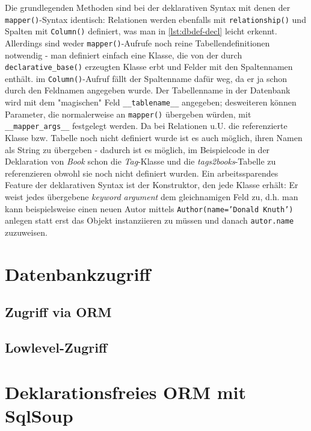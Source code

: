 Die grundlegenden Methoden sind bei der deklarativen Syntax mit denen der
\texttt{mapper()}-Syntax identisch: Relationen werden ebenfalls mit
\texttt{relationship()} und Spalten mit \texttt{Column()} definiert, was man in
\autoref{lst:dbdef-decl} leicht erkennt.
Allerdings sind weder \texttt{mapper()}-Aufrufe noch reine Tabellendefinitionen
notwendig - man definiert einfach eine Klasse, die von der durch
\texttt{declarative\_base()} erzeugten Klasse erbt und Felder mit den
Spaltennamen enthält. im \texttt{Column()}-Aufruf fällt der Spaltenname dafür
weg, da er ja schon durch den Feldnamen angegeben wurde. Der Tabellenname in der
Datenbank wird mit dem "magischen" Feld \texttt{\_\_tablename\_\_} angegeben;
desweiteren können Parameter, die normalerweise an \texttt{mapper()} übergeben
würden, mit \texttt{\_\_mapper\_args\_\_} festgelegt werden.
Da bei Relationen u.U. die referenzierte Klasse bzw. Tabelle noch nicht definiert
wurde ist es auch möglich, ihren Namen als String zu übergeben - dadurch ist es
möglich, im Beispielcode in der Deklaration von \emph{Book} schon die
\emph{Tag}-Klasse und die \emph{tags2books}-Tabelle zu referenzieren obwohl sie
noch nicht definiert wurden.
Ein arbeitssparendes Feature der deklarativen Syntax ist der Konstruktor, den
jede Klasse erhält: Er weist jedes übergebene \textit{keyword argument} dem
gleichnamigen Feld zu, d.h. man kann beispielsweise einen neuen Autor mittels
\texttt{Author(name='Donald Knuth')} anlegen statt erst das Objekt instanziieren
zu müssen und danach \texttt{autor.name} zuzuweisen.




\section{Datenbankzugriff}
\subsection{Zugriff via ORM}
\subsection{Lowlevel-Zugriff}

\section{Deklarationsfreies ORM mit SqlSoup}

